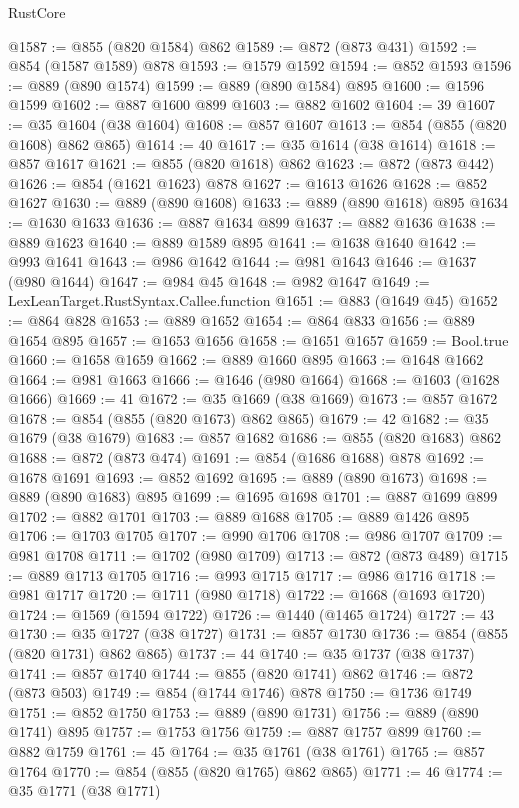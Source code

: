 \begin{lexlean}{RustCore}
\begin{coremodule}
@1587 := @855 (@820 @1584) @862
@1589 := @872 (@873 @431)
@1592 := @854 (@1587 @1589) @878
@1593 := @1579 @1592
@1594 := @852 @1593
@1596 := @889 (@890 @1574)
@1599 := @889 (@890 @1584) @895
@1600 := @1596 @1599
@1602 := @887 @1600 @899
@1603 := @882 @1602
@1604 := 39
@1607 := @35 @1604 (@38 @1604)
@1608 := @857 @1607
@1613 := @854 (@855 (@820 @1608) @862 @865)
@1614 := 40
@1617 := @35 @1614 (@38 @1614)
@1618 := @857 @1617
@1621 := @855 (@820 @1618) @862
@1623 := @872 (@873 @442)
@1626 := @854 (@1621 @1623) @878
@1627 := @1613 @1626
@1628 := @852 @1627
@1630 := @889 (@890 @1608)
@1633 := @889 (@890 @1618) @895
@1634 := @1630 @1633
@1636 := @887 @1634 @899
@1637 := @882 @1636
@1638 := @889 @1623
@1640 := @889 @1589 @895
@1641 := @1638 @1640
@1642 := @993 @1641
@1643 := @986 @1642
@1644 := @981 @1643
@1646 := @1637 (@980 @1644)
@1647 := @984 @45
@1648 := @982 @1647
@1649 := LexLeanTarget.RustSyntax.Callee.function
@1651 := @883 (@1649 @45)
@1652 := @864 @828
@1653 := @889 @1652
@1654 := @864 @833
@1656 := @889 @1654 @895
@1657 := @1653 @1656
@1658 := @1651 @1657
@1659 := Bool.true
@1660 := @1658 @1659
@1662 := @889 @1660 @895
@1663 := @1648 @1662
@1664 := @981 @1663
@1666 := @1646 (@980 @1664)
@1668 := @1603 (@1628 @1666)
@1669 := 41
@1672 := @35 @1669 (@38 @1669)
@1673 := @857 @1672
@1678 := @854 (@855 (@820 @1673) @862 @865)
@1679 := 42
@1682 := @35 @1679 (@38 @1679)
@1683 := @857 @1682
@1686 := @855 (@820 @1683) @862
@1688 := @872 (@873 @474)
@1691 := @854 (@1686 @1688) @878
@1692 := @1678 @1691
@1693 := @852 @1692
@1695 := @889 (@890 @1673)
@1698 := @889 (@890 @1683) @895
@1699 := @1695 @1698
@1701 := @887 @1699 @899
@1702 := @882 @1701
@1703 := @889 @1688
@1705 := @889 @1426 @895
@1706 := @1703 @1705
@1707 := @990 @1706
@1708 := @986 @1707
@1709 := @981 @1708
@1711 := @1702 (@980 @1709)
@1713 := @872 (@873 @489)
@1715 := @889 @1713 @1705
@1716 := @993 @1715
@1717 := @986 @1716
@1718 := @981 @1717
@1720 := @1711 (@980 @1718)
@1722 := @1668 (@1693 @1720)
@1724 := @1569 (@1594 @1722)
@1726 := @1440 (@1465 @1724)
@1727 := 43
@1730 := @35 @1727 (@38 @1727)
@1731 := @857 @1730
@1736 := @854 (@855 (@820 @1731) @862 @865)
@1737 := 44
@1740 := @35 @1737 (@38 @1737)
@1741 := @857 @1740
@1744 := @855 (@820 @1741) @862
@1746 := @872 (@873 @503)
@1749 := @854 (@1744 @1746) @878
@1750 := @1736 @1749
@1751 := @852 @1750
@1753 := @889 (@890 @1731)
@1756 := @889 (@890 @1741) @895
@1757 := @1753 @1756
@1759 := @887 @1757 @899
@1760 := @882 @1759
@1761 := 45
@1764 := @35 @1761 (@38 @1761)
@1765 := @857 @1764
@1770 := @854 (@855 (@820 @1765) @862 @865)
@1771 := 46
@1774 := @35 @1771 (@38 @1771)

\end{coremodule}
\end{lexlean}
